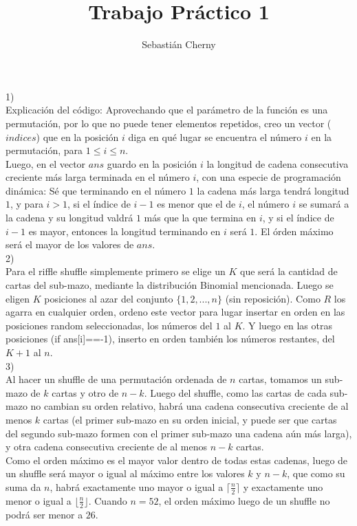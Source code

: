 \documentclass[a4paper]{article}
\title{Trabajo Práctico 1}
\author{Sebastián Cherny}
\begin{document}
\maketitle

1)\\
Explicación del código: Aprovechando que el parámetro de la función es una permutación, por lo que no puede tener elementos repetidos, creo un vector ($indices$) que en la posición $i$ diga en qué lugar se encuentra el número $i$ en la permutación, para $1 \leq i \leq n$. \\
Luego, en el vector $ans$ guardo en la posición $i$ la longitud de cadena consecutiva creciente más larga terminada en el número $i$, con una especie de programación dinámica: Sé que terminando en el número $1$ la cadena más larga tendrá longitud $1$, y para $i>1$, si el índice de $i-1$ es menor que el de $i$, el número $i$ se sumará a la cadena y su longitud valdrá $1$ más que la que termina en $i$, y si el índice de $i-1$ es mayor, entonces la longitud terminando en $i$ será $1$. El órden máximo será el mayor de los valores de $ans$.\\

2)\\
Para el riffle shuffle simplemente primero se elige un $K$ que será la cantidad de cartas del sub-mazo, mediante la distribución Binomial mencionada. Luego se eligen $K$ posiciones al azar del conjunto $\{1, 2, ..., n\}$ (sin reposición). Como $R$ los agarra en cualquier orden, ordeno este vector para lugar insertar en orden en las posiciones random seleccionadas, los números del $1$ al $K$. Y luego en las otras posiciones (if ans[i]==-1), inserto en orden también los números restantes, del $K+1$ al $n$.\\

3)\\
Al hacer un shuffle de una permutación ordenada de $n$ cartas, tomamos un sub-mazo de $k$ cartas y otro de $n-k$. Luego del shuffle, como las cartas de cada sub-mazo no cambian su orden relativo, habrá una cadena consecutiva creciente de al menos $k$ cartas (el primer sub-mazo en su orden inicial, y puede ser que cartas del segundo sub-mazo formen con el primer sub-mazo una cadena aún más larga), y otra cadena consecutiva creciente de al menos $n-k$ cartas.\\
Como el orden máximo es el mayor valor dentro de todas estas cadenas, luego de un shuffle será mayor o igual al máximo entre los valores $k$ y $n-k$, que como su suma da $n$, habrá exactamente uno mayor o igual a $\lceil \frac{n}{2}\rceil$ y exactamente uno menor o igual a $\lfloor \frac{n}{2}\rfloor$. Cuando $n=52$, el orden máximo luego de un shuffle no podrá ser menor a $26$.
\end{document}
